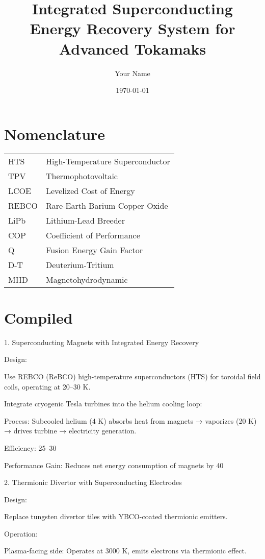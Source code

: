 \documentclass{article}%
\title{Integrated Superconducting Energy Recovery System for Advanced Tokamaks}
\author{Your Name}
\date{\today}
\begin{document}
\maketitle

\section*{Nomenclature}
\begin{tabular}{ll}
HTS & High-Temperature Superconductor \\
TPV & Thermophotovoltaic \\
LCOE & Levelized Cost of Energy \\
REBCO & Rare-Earth Barium Copper Oxide \\
LiPb & Lithium-Lead Breeder \\
COP & Coefficient of Performance \\
Q & Fusion Energy Gain Factor \\
D-T & Deuterium-Tritium \\
MHD & Magnetohydrodynamic \\
\end{tabular}

\section{Compiled}
1. Superconducting Magnets with Integrated Energy Recovery

    Design:

        Use REBCO (ReBCO) high-temperature superconductors (HTS) for toroidal field coils, operating at 20–30 K.

        Integrate cryogenic Tesla turbines into the helium cooling loop:

            Process: Subcooled helium (4 K) absorbs heat from magnets → vaporizes (20 K) → drives turbine → electricity generation.

            Efficiency: 25–30%

        Performance Gain: Reduces net energy consumption of magnets by 40%

2. Thermionic Divertor with Superconducting Electrodes

    Design:

        Replace tungsten divertor tiles with YBCO-coated thermionic emitters.

        Operation:

            Plasma-facing side: Operates at 3000 K, emits electrons via thermionic effect.
\end{document}
